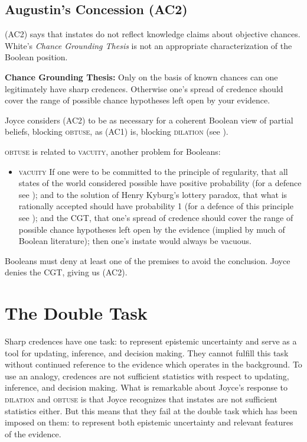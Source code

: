 \documentclass[11pt]{article}
\begin{document}
\subsection{Augustin's Concession (AC2)}
\label{jj2}

(AC2) says that instates do not reflect knowledge claims about
objective chances. White's \emph{Chance Grounding Thesis} is not an
appropriate characterization of the Boolean position.

\begin{quotex}
  \textbf{Chance Grounding Thesis:} Only on the basis of known chances
  can one legitimately have sharp credences. Otherwise one's spread of
  credence should cover the range of possible chance hypotheses left
  open by your evidence. 
\end{quotex}

Joyce considers (AC2) to be as necessary for a coherent Boolean view
of partial beliefs, blocking \textsc{obtuse}, as (AC1) is, blocking
\textsc{dilation} (see ). 

\textsc{obtuse} is related to \textsc{vacuity}, another problem for
Booleans:

\begin{itemize}
\item \textsc{vacuity} If one were to be committed to the principle of
  regularity, that all states of the world considered possible have
  positive probability (for a defence see );
  and to the solution of Henry Kyburg's lottery paradox, that what is
  rationally accepted should have probability 1 (for a defence of this
  principle see ); and the CGT, that
  one's spread of credence should cover the range of possible chance
  hypotheses left open by the evidence (implied by much of Boolean
  literature); then one's instate would always be vacuous.
\end{itemize}

Booleans must deny at least one of the premises to avoid the
conclusion. Joyce denies the CGT, giving us (AC2). 

\section{The Double Task}
\label{TheDoubleTask}

Sharp credences have one task: to represent epistemic uncertainty and
serve as a tool for updating, inference, and decision making. They
cannot fulfill this task without continued reference to the evidence
which operates in the background. To use an analogy, credences are not
sufficient statistics with respect to updating, inference, and
decision making. What is remarkable about Joyce's response to
\textsc{dilation} and \textsc{obtuse} is that Joyce recognizes that
instates are not sufficient statistics either. But this means that
they fail at the double task which has been imposed on them: to
represent both epistemic uncertainty and relevant features of the evidence.
\end{document}
